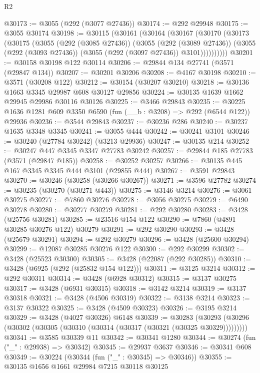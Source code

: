 \begin{lexlean}{R2}
\begin{coremodule}
@30173 := @3055 (@292 (@3077 @27436))
@30174 := @292 @29948
@30175 := @3055 @30174
@30198 := @30115
    (@30161
      (@30164
        (@30167
          (@30170
            (@30173
              (@30175
                (@3055
                  (@292 (@3085 @27436))
                  (@3055
                    (@292 (@3089 @27436))
                    (@3055 (@292 (@3093 @27436)) (@3055 (@292 (@3097 @27436)) @3101))))))))))
@30201 := @30158 @30198 @122 @30114
@30206 := @29844 @134 @27741 (@3571 (@29847 @134))
@30207 := @30201 @30206
@30208 := @4167 @30198
@30210 := @3571 (@30208 @122)
@30212 := @30154 (@30207 @30210)
@30218 := @30136 @1663 @3345 @29987 @608 @30127 @29856
@30224 := @30135 @1639 @1662 @29945 @29986 @30116 @30126
@30225 := @3466 @29843
@30235 := @30225 @1636 @1281 @609 @3350 @6590 (fun (__b : @3208) => @292 (@6544 @122)) @29936
@30236 := @3544 @29843
@30237 := @30236 @286
@30240 := @30237 @1635 @3348 @3345
@30241 := @3055 @444
@30242 := @30241 @3101
@30246 := @30240 (@27784 @30242) (@3213 @29936)
@30247 := @30135 @214
@30252 := @30247 @447 @3345 @3347 @27783 @30242
@30257 := @29844 @185 @27783 (@3571 (@29847 @185))
@30258 := @30252 @30257
@30266 := @30135 @445 @167 @3345 @3345 @444 @3101 (@29855 @444)
@30267 := @3591 @29843
@30270 := @30246 (@30258 (@30266 @30267))
@30271 := @3596 @27782
@30274 := @30235 (@30270 (@30271 @443))
@30275 := @3146 @3214
@30276 := @3061 @30275
@30277 := @7860 @30276
@30278 := @3056 @30275
@30279 := @6490 @30278
@30280 := @30277 @30279
@30281 := @292 @30280
@30283 := @3428 (@25756 @30281)
@30285 := @23516 @154 @122
@30290 := @7860 (@4891 @30285 @30276 @122) @30279
@30291 := @292 @30290
@30293 := @3428 (@25679 @30291)
@30294 := @292 @30279
@30296 := @3428 (@25600 @30294)
@30299 := @12087 @30285 @30276 @122
@30300 := @292 @30299
@30302 := @3428 (@25523 @30300)
@30305 := @3428 (@22087 (@292 @30285))
@30310 := @3428 (@6925 (@292 (@25832 @154 @122)))
@30311 := @3125 @3214
@30312 := @292 @30311
@30314 := @3428 (@6928 @30312)
@30315 := @3137 @30275
@30317 := @3428 (@6931 @30315)
@30318 := @3142 @3214
@30319 := @3137 @30318
@30321 := @3428 (@4506 @30319)
@30322 := @3138 @3214
@30323 := @3137 @30322
@30325 := @3428 (@4509 @30323)
@30326 := @3195 @3214
@30329 := @3428 (@4027 @30326) @6148
@30339 := @30283
    (@30293 (@30296 (@30302 (@30305 (@30310 (@30314 (@30317 (@30321 (@30325 @30329)))))))))
@30341 := @3585 @30339 @11
@30342 := @30341 @1280
@30344 := @30274 (fun ("_" : @29938) => @30342)
@30345 := @29937 @3637
@30346 := @30341 @608
@30349 := @30224 (@30344 (fun ("_" : @30345) => @30346))
@30355 := @30135 @1656 @1661 @29984 @7215 @30118 @30125

\end{coremodule}
\end{lexlean}
